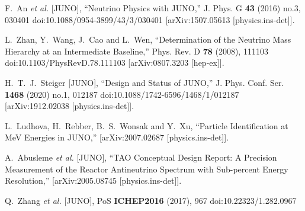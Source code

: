 \documentclass[10pt,a4paper]{article}
\begin{document}
\begin{thebibliography}{99} 
F.~An \textit{et al.} [JUNO],
``Neutrino Physics with JUNO,''
J. Phys. G \textbf{43} (2016) no.3, 030401
doi:10.1088/0954-3899/43/3/030401
[arXiv:1507.05613 [physics.ins-det]].

L.~Zhan, Y.~Wang, J.~Cao and L.~Wen,
``Determination of the Neutrino Mass Hierarchy at an Intermediate Baseline,''
Phys. Rev. D \textbf{78} (2008), 111103
doi:10.1103/PhysRevD.78.111103
[arXiv:0807.3203 [hep-ex]].

H.~T.~J.~Steiger [JUNO],
``Design and Status of JUNO,''
J. Phys. Conf. Ser. \textbf{1468} (2020) no.1, 012187
doi:10.1088/1742-6596/1468/1/012187
[arXiv:1912.02038 [physics.ins-det]].

L.~Ludhova, H.~Rebber, B.~S.~Wonsak and Y.~Xu,
``Particle Identification at MeV Energies in JUNO,''
[arXiv:2007.02687 [physics.ins-det]].

A.~Abusleme \textit{et al.} [JUNO],
``TAO Conceptual Design Report: A Precision Measurement of the Reactor Antineutrino Spectrum with Sub-percent Energy Resolution,''
[arXiv:2005.08745 [physics.ins-det]].

Q.~Zhang \textit{et al.} [JUNO],
PoS \textbf{ICHEP2016} (2017), 967
doi:10.22323/1.282.0967

\end{thebibliography}
\end{document}

